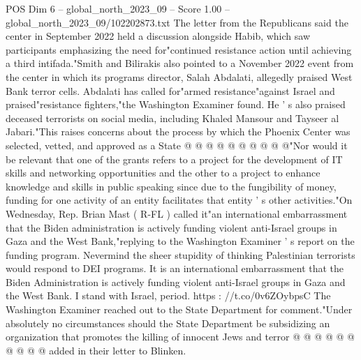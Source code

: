 \begin{textsample}{POS Dim 6 – global\_north\_2023\_09 – Score 1.00 – global\_north\_2023\_09/102202873.txt}
The letter from the Republicans said the center in September 2022 held a discussion alongside Habib, which saw participants emphasizing the need for"continued resistance action until achieving a third intifada."Smith and Bilirakis also pointed to a November 2022 event from the center in which its programs director, Salah Abdalati, allegedly praised West Bank terror cells.
Abdalati has called for"armed resistance"against Israel and praised"resistance fighters,"the Washington Examiner found.
He ' s also praised deceased terrorists on social media, including Khaled Mansour and Tayseer al Jabari."This raises concerns about the process by which the Phoenix Center was selected, vetted, and approved as a State @ @ @ @ @ @ @ @ @ @"Nor would it be relevant that one of the grants refers to a project for the development of IT skills and networking opportunities and the other to a project to enhance knowledge and skills in public speaking since due to the fungibility of money, funding for one activity of an entity facilitates that entity ' s other activities."On Wednesday, Rep.
Brian Mast ( R-FL ) called it"an international embarrassment that the Biden administration is actively funding violent anti-Israel groups in Gaza and the West Bank,"replying to the Washington Examiner ' s report on the funding program.
Nevermind the sheer stupidity of thinking Palestinian terrorists would respond to DEI programs.
It is an international embarrassment that the Biden Administration is actively funding violent anti-Israel groups in Gaza and the West Bank.
I stand with Israel, period. https : //t.co/0v6ZOybpsC The Washington Examiner reached out to the State Department for comment."Under absolutely no circumstances should the State Department be subsidizing an organization that promotes the killing of innocent Jews and terror @ @ @ @ @ @ @ @ @ @ added in their letter to Blinken.

\end{textsample}
